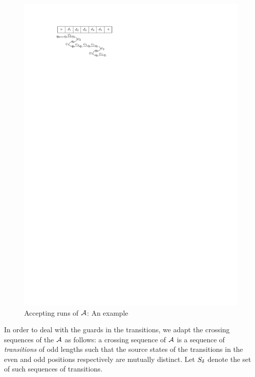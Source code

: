 \begin{figure}[htbp]
\begin{center}
\includegraphics{2sa-sa-exmp.pdf}
\end{center}
\caption{Accepting runs of $\mathcal{A}$: An example}\label{fig-2sa-sa}
\end{figure}

In order to deal with the guards in the transitions, we adapt the crossing sequences of the \SSA{} $\mathcal{A}$  as follows: a crossing sequence of $\mathcal{A}$ is a sequence of \emph{transitions} of odd lengths such that  the source states of the transitions in the even and odd  positions respectively are mutually distinct. Let $S_{\delta}$ denote the set of such sequences of transitions. 


